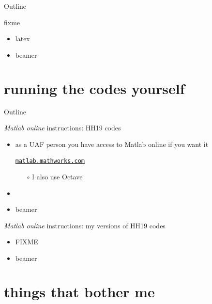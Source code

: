 \documentclass[xcolor={svgnames},
               hyperref={colorlinks,citecolor=DeepPink4,linkcolor=FireBrick,urlcolor=Maroon}]
               {beamer}
\begin{document}
\begin{frame}{Outline}
\end{frame}


\begin{frame}{fixme}

\begin{itemize}
\item latex
\item beamer
\end{itemize}
\end{frame}


\section{running the codes yourself}

\begin{frame}{Outline}
\end{frame}


\begin{frame}{\emph{Matlab online} instructions: HH19 codes}

\begin{itemize}
\item as a UAF person you have access to Matlab online if you want it

\begin{center}
\href{https://matlab.mathworks.com/}{\texttt{matlab.mathworks.com}}
\end{center}

    \begin{itemize}
    \item[$\circ$] I also use Octave
    \end{itemize}
\item 
\item beamer
\end{itemize}
\end{frame}


\begin{frame}{\emph{Matlab online} instructions: my versions of HH19 codes}

\begin{itemize}
\item FIXME
\item beamer
\end{itemize}
\end{frame}


\section{things that bother me}
\end{document}
